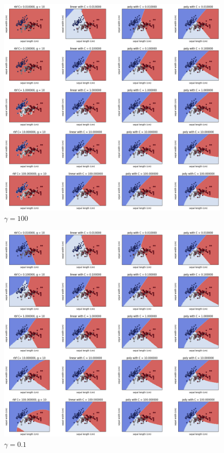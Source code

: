 \begin{figure}[H]
    \includegraphics[scale = 0.45]{img/output3.png}
    \caption{$\gamma = 100$}
    \label{fig:q3.3}
\end{figure}
\begin{figure}[H]
    \includegraphics[scale = 0.45]{img/output4.png}
    \caption{$\gamma = 0.1$}
    \label{fig:q3.4}
\end{figure}

